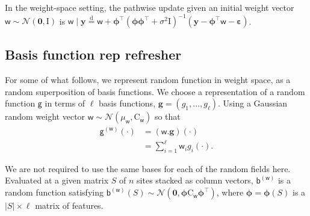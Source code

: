 \documentclass{article}
\newcommand{\vv}[1]{\boldsymbol{#1}}
\newcommand{\mm}[1]{\mathrm{#1}}
\newcommand{\rv}[1]{\mathsf{#1}}
\newcommand{\vrv}[1]{\vv{\rv{#1}}}
\newcommand{\dist}[1]{\mathcal{#1}}
\newcommand{\set}[1]{#1}
\newcommand{\disteq}{\stackrel{\mathrm{d}}{=}}
\newcommand{\gvn}{\mid}
\newcommand{\lat}{\rv{b}}   %
\begin{document}
In the weight-space setting, the pathwise update given an initial weight vector \(\vrv{w} \sim \dist{N}(\mathbf{0}, \mm{I})\) is  \(\vrv{w} \gvn \boldsymbol{y} \disteq \vrv{w}+\vv{\phi}^{\top}\left(\vv{\phi} \vv{\phi}^{\top}+\sigma^{2} \mm{I}\right)^{-1}\left(\boldsymbol{y}-\vv{\phi}^{\top} \vrv{w}-\boldsymbol{\varepsilon}\right)\).

\subsection{Basis function rep refresher}

For some of what follows, we represent random function in weight space, as a random superposition of basis functions.
We choose a representation of a random function \(\rv{g}\) in terms of \(\ell\) basis functions, \(\vv{g}=\left(g_{1}, \ldots, g_{\ell}\right)\).
Using a Gaussian random weight vector \(\vrv{w} \sim \dist{N}\left(\mu_{\vrv{w}}, \mm{C}_{\vrv{w}}\right)\) so that
\begin{align*}
\rv{g}^{(\vrv{w})}(\cdot)&= (\vrv{w}.\vv{g})(\cdot) \label{eq:weightspace}\\
&=\sum_{i=1}^{\ell} \rv{w}_{i} g_{i}(\cdot).
\end{align*}

We are not required to use the same bases for each of the random fields here.
Evaluated at a given matrix \(\set{S}\) of \(n\) sites stacked as column vectors, 
\(\lat^{(\vrv{w})}\) is a random function satisfying \(\lat^{(\vrv{w})}(\set{S}) \sim \dist{N}\left(\mathbf{0}, \vv{\phi} \mm{C}_{\vrv{w}} \vv{\phi}^{\top}\right)\), where \(\vv{\phi}=\vv{\phi}(\set{S})\) is a \(|\set{S}| \times \ell\) matrix of features.
\end{document}
